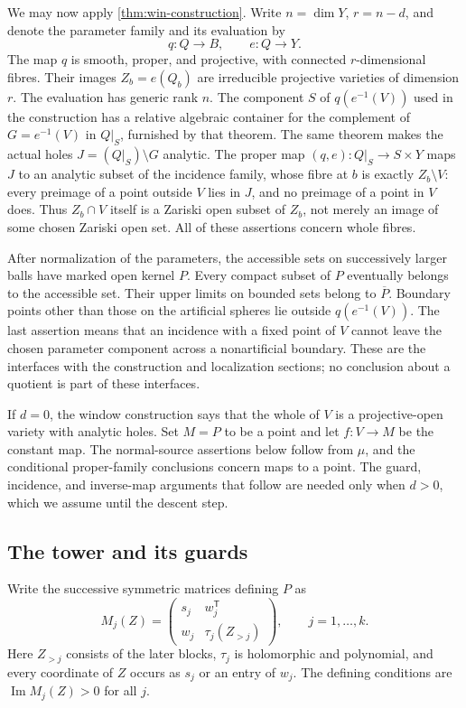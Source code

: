 We may now apply \cref{thm:win-construction}. Write $n=\dim Y$, $r=n-d$, and denote the parameter family and its evaluation by
\[
 q:Q\longrightarrow B,\qquad e:Q\longrightarrow Y.
\]
The map $q$ is smooth, proper, and projective, with connected $r$-dimensional fibres. Their images $Z_b=e(Q_b)$ are irreducible projective varieties of dimension $r$. The evaluation has generic rank $n$. The component $S$ of $q(e^{-1}(V))$ used in the construction has a relative algebraic container for the complement of $G=e^{-1}(V)$ in $Q|_S$, furnished by that theorem. The same theorem makes the actual holes $J=(Q|_S)\setminus G$ analytic. The proper map $(q,e):Q|_S\to S\times Y$ maps $J$ to an analytic subset of the incidence family, whose fibre at $b$ is exactly $Z_b\setminus V$: every preimage of a point outside $V$ lies in $J$, and no preimage of a point in $V$ does. Thus $Z_b\cap V$ itself is a Zariski open subset of $Z_b$, not merely an image of some chosen Zariski open set. All of these assertions concern whole fibres.

After normalization of the parameters, the accessible sets on successively larger balls have marked open kernel $P$. Every compact subset of $P$ eventually belongs to the accessible set. Their upper limits on bounded sets belong to $\overline P$. Boundary points other than those on the artificial spheres lie outside $q(e^{-1}(V))$. The last assertion means that an incidence with a fixed point of $V$ cannot leave the chosen parameter component across a nonartificial boundary. These are the interfaces with the construction and localization sections; no conclusion about a quotient is part of these interfaces.

If $d=0$, the window construction says that the whole of $V$ is a projective-open variety with analytic holes. Set $M=P$ to be a point and let $f:V\to M$ be the constant map. The normal-source assertions below follow from $\mu$, and the conditional proper-family conclusions concern maps to a point. The guard, incidence, and inverse-map arguments that follow are needed only when $d>0$, which we assume until the descent step.

\subsection{The tower and its guards}

Write the successive symmetric matrices defining $P$ as
\[
 M_j(Z)=
 \begin{pmatrix}s_j&w_j^{\mathsf T}\\w_j&\tau_j(Z_{>j})\end{pmatrix},
 \qquad j=1,\ldots,k.
\]
Here $Z_{>j}$ consists of the later blocks, $\tau_j$ is holomorphic and polynomial, and every coordinate of $Z$ occurs as $s_j$ or an entry of $w_j$. The defining conditions are $\operatorname{Im}M_j(Z)>0$ for all $j$.

